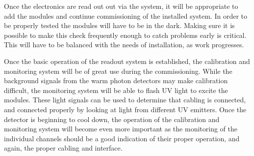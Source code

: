 Once the electronics are read out out via the  system, it will be appropriate to add the  modules and continue commissioning of the installed system.  In order to be properly tested the  modules will have to be in the dark.  Making sure it is possible to make this check frequently enough to catch problems early is critical. This will have to be balanced with the needs of installation, as work progresses.  

Once the basic operation of the readout system is established, the calibration and monitoring system will be of great use during the commissioning.  While the background signals from the warm photon detectors may make calibration difficult, the monitoring system will be able to flash UV light to excite the  modules.  These light signals can be used to determine that cabling is connected, and connected properly by looking at light from different UV emitters.  Once the detector is beginning to cool down, the operation of the calibration and monitoring system will become even more important as the monitoring of the individual channels should be a good indication of their proper operation, and again, the proper cabling and interface.


 

